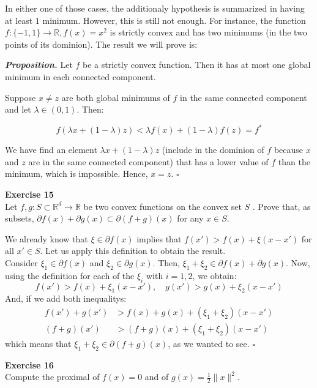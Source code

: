 \documentclass[11pt,table]{article}
\newcommand{\qed}{\hfill $\square$}
\newenvironment{problem}[2][Exercise]
{ \begin{mdframed}[backgroundcolor=gray!20] \textbf{#1 #2} \\}
	{  \end{mdframed}}
\newcommand\R{\mathbb R}
\begin{document}
	In either one of those cases, the additionaly hypothesis is summarized in having at least $1$ minimum. However, this is still not enough. For instance, the function $f:\{-1,1\} \rightarrow \R, f(x) = x^2$ is strictly convex and has two minimums (in the two points of its dominion). The result we will prove is:
	
	\emph{\textbf{Proposition.}} Let \( f \) be a strictly convex function. Then  it has at most one global minimum in each connected component.
	
	Suppose $x \neq z$ are both global minimums of $f$ in the same connected component and let $\lambda \in (0,1)$. Then:
	
	\[
	f(\lambda x + (1-\lambda)z) < \lambda f(x) + (1-\lambda) f(z) = f^*
	\]
	
	We have find an element $\lambda x + (1-\lambda)z$ (include in the dominion of $f$ because $x$ and $z$ are in the same connected component) that has a lower value of $f$ than the minimum, which is impossible. Hence, $x = z$. \qed \\
	
	\begin{problem}{15}
		Let \( f,g: S \subset \mathbb{R}^d \to \mathbb{R} \)  be two convex functions on the convex set \( S \) . Prove that, as subsets, \(  \partial f(x) + \partial g(x) \subset \partial(f+g)(x) \) for any $x\in S$.
	\end{problem}
	
	We already know that \(\xi \in \partial f(x)\) implies that \(f(x') > f(x) + \xi(x-x')\) for all \(x' \in S\). Let us apply this definition to obtain the result.\\
	Consider \(\xi_1 \in \partial f(x)\) and \(\xi_2 \in \partial g(x)\). Then, \(\xi_1 + \xi_2 \in \partial f(x) + \partial g(x)\). Now, using the definition for each of the \(\xi_i\) with \(i = 1,2\), we obtain:
	\[
	f(x') > f(x) + \xi_1 (x-x'), \quad g(x') > g(x) + \xi_2(x-x')
	\]
	And, if we add both inequalitys:
	\begin{align*}
		f(x') + g(x')        & > f(x) + g(x) + (\xi_1 + \xi_2)(x-x')        \\
		\left(f+g\right)(x') & >\left(f+g\right)(x) + (\xi_1 + \xi_2)(x-x')
	\end{align*}
	which means that \(\xi_1 + \xi_2 \in \partial \left(f+g\right)(x) \), as we wanted to see. \qed \\
	
	\begin{problem}{16}
		Compute the proximal of \( f(x) = 0 \) and of \( g(x) = \frac{1}{2}\|x\|^2 \).
	\end{problem}
	
\end{document}

